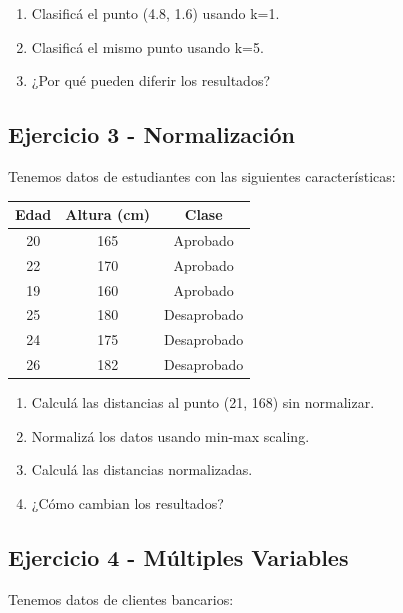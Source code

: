 \documentclass[12pt]{article}
\begin{document}
\begin{enumerate}
    \item Clasificá el punto (4.8, 1.6) usando k=1.
    \item Clasificá el mismo punto usando k=5.
    \item ¿Por qué pueden diferir los resultados?
\end{enumerate}

\subsection{Ejercicio 3 - Normalización}

Tenemos datos de estudiantes con las siguientes características:

\begin{table}[H]
    \centering
    \begin{tabular}{ccc}
        \toprule
        \textbf{Edad} & \textbf{Altura (cm)} & \textbf{Clase} \\
        \midrule
        20 & 165 & Aprobado \\
        22 & 170 & Aprobado \\
        19 & 160 & Aprobado \\
        25 & 180 & Desaprobado \\
        24 & 175 & Desaprobado \\
        26 & 182 & Desaprobado \\
        \bottomrule
    \end{tabular}
\end{table}

\begin{enumerate}
    \item Calculá las distancias al punto (21, 168) sin normalizar.
    \item[b)] Normalizá los datos usando min-max scaling.
    \item[c)] Calculá las distancias normalizadas.
    \item[d)] ¿Cómo cambian los resultados?
\end{enumerate}

\subsection{Ejercicio 4 - Múltiples Variables}

Tenemos datos de clientes bancarios:
\end{document}
